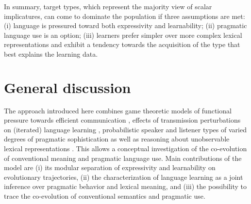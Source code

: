 \documentclass[a4paper, 11pt]{article}
\theoremstyle{Satz}
\begin{document}
In summary, target types, which represent the majority view of scalar implicatures, can come to
dominate the population if three assumptions are met: (i) language is pressured toward both
expressivity and learnability; (ii) pragmatic language use is an option; (iii) learners prefer
simpler over more complex lexical representations and exhibit a tendency towards the
acquisition of the type that best explains the learning data.


\section{General discussion}\label{sec:discussion}

The approach introduced here combines game theoretic models of functional pressure towards
efficient communication \citep{nowak+krakauer:1999}, effects of transmission perturbations on
(iterated) language learning \citep{griffiths+kalish:2007}, probabilistic speaker and listener
types of varied degrees of pragmatic sophistication \citep{frank+goodman:2012,
  franke+jaeger:2014} as well as reasoning about unobservable lexical representations
\citep{bergen+etal:2012,bergen+etal:2016}. This allows a conceptual investigation of the
co-evolution of conventional meaning and pragmatic language use. Main contributions of the
model are (i) its modular separation of expressivity and learnability on evolutionary
trajectories, (ii) the characterization of language learning as a joint inference over
pragmatic behavior and lexical meaning, and (iii) the possibility to trace the co-evolution of
conventional semantics and pragmatic use.
\end{document}
